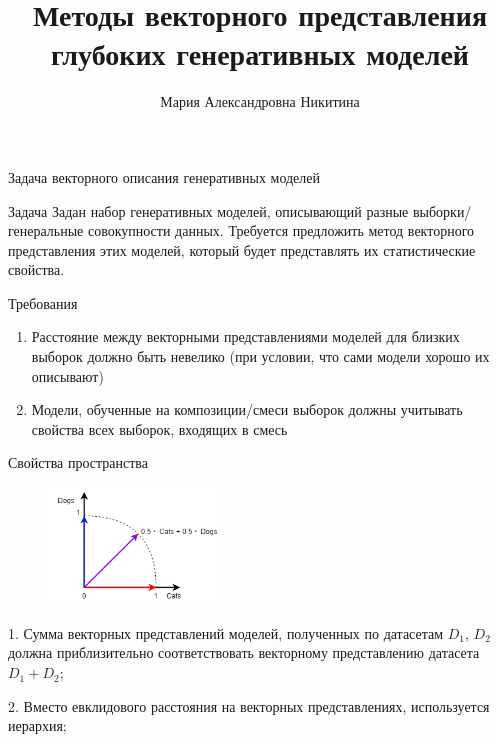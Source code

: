 \documentclass{beamer}
\title[\hbox to 56mm{Векторное представление моделей}]{Методы векторного представления глубоких генеративных моделей}
\author[М.\,А. Никитина]{Мария Александровна Никитина}
\institute{Московский физико-технический институт}
\date{\footnotesize
\par\smallskip\emph{Кафедра:} Интеллектуальный анализ данных
\par\smallskip\emph{Научный руководитель:} кандидат ф.-м. наук О.\,Ю.~Бахтеев
\par\smallskip\emph{Научный консультант:} А.\,Ю.~Бишук
\par\bigskip\small 2025}
\begin{document}
\begin{frame}
\thispagestyle{empty}
\maketitle
\end{frame}
\begin{frame}{Задача векторного описания генеративных моделей}
\begin{block}{Задача}
Задан набор генеративных моделей, описывающий разные выборки/генеральные совокупности данных. Требуется предложить метод векторного представления этих моделей, который будет представлять их статистические свойства.
\end{block}
\begin{block}{Требования}
\begin{enumerate}
    \item Расстояние между векторными представлениями моделей для близких выборок должно быть невелико (при условии, что сами модели хорошо их описывают)
    \item Модели, обученные на композиции/смеси выборок должны учитывать свойства всех выборок, входящих в смесь
\end{enumerate}
\end{block}
\end{frame}
\begin{frame}{Свойства пространства}
\begin{figure}
  \vspace{-20pt}
  \begin{center}
    \includegraphics[width=0.4\textwidth]{Pictures/Classes.png}
  \end{center}
  \vspace{-20pt}
\end{figure}
1. Сумма векторных представлений моделей, полученных по датасетам $D_1$, $D_2$ должна приблизительно соответствовать векторному представлению датасета $D_1 + D_2$;

\bigskip

2. Вместо евклидового расстояния на векторных представлениях, используется иерархия;
\end{frame}
\end{document}
